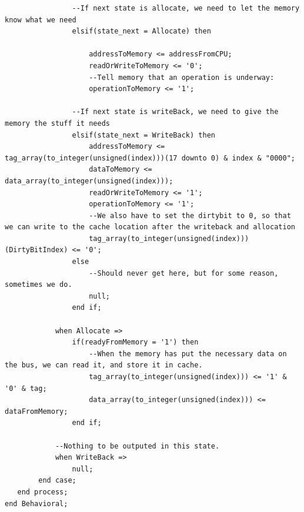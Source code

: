 \documentclass{article}
\begin{document}
\begin{lstlisting}
                --If next state is allocate, we need to let the memory know what we need
                elsif(state_next = Allocate) then

                    addressToMemory <= addressFromCPU;
                    readOrWriteToMemory <= '0';
                    --Tell memory that an operation is underway:
                    operationToMemory <= '1';

                --If next state is writeBack, we need to give the memory the stuff it needs
                elsif(state_next = WriteBack) then
                    addressToMemory <= tag_array(to_integer(unsigned(index)))(17 downto 0) & index & "0000";
                    dataToMemory <= data_array(to_integer(unsigned(index)));
                    readOrWriteToMemory <= '1';
                    operationToMemory <= '1';
                    --We also have to set the dirtybit to 0, so that we can write to the cache location after the writeback and allocation
                    tag_array(to_integer(unsigned(index)))(DirtyBitIndex) <= '0';
                else
                    --Should never get here, but for some reason, sometimes we do.
                    null;
                end if;

            when Allocate =>
                if(readyFromMemory = '1') then
                    --When the memory has put the necessary data on the bus, we can read it, and store it in cache.
                    tag_array(to_integer(unsigned(index))) <= '1' & '0' & tag;
                    data_array(to_integer(unsigned(index))) <= dataFromMemory;
                end if;

            --Nothing to be outputed in this state.
            when WriteBack =>
                null;
        end case;
   end process;
end Behavioral;

\end{lstlisting}
\end{document}
